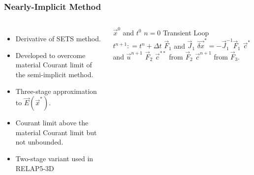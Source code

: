 \documentclass[compress,xcolor=table]{beamer}
\begin{document}
\begin{frame}
\frametitle{Nearly-Implicit Method}

\begin{columns}

\begin{itemize}
\item{Derivative of SETS method.}
\item{Developed to overcome material Courant limit of the semi-implicit method.}
\item{Three-stage approximation to $\vec{E}(\vec{x}^{*})$.}
\item{Courant limit above the material Courant limit but not unbounded.}
\item{Two-stage variant used in RELAP5-3D}
\end{itemize}

\begin{algorithmic}
\scriptsize
\Require $\vec{x}^{0}$ and $t^{0}$
\Set $n = 0$
\Loop \; Transient Loop
    \State $t^{n+1} : = t^{n} + \Delta t$
	\Calculate $\vec{F}_1$ and $\vec{J}_1$
	\Calculate $\vec{\delta x}^{*} = -\vec{J}^{-1}_1\vec{F}_1$
	\Calculate $\vec{c}^{*}$ and $\vec{u}^{n+1}$
	\Calculate $\vec{F}_2$
	\Calculate $\vec{c}^{**}$ from $\vec{F}_2$
	\Calculate $\vec{c}^{n+1}$ from $\vec{F}_3$.
\end{algorithmic}

\end{columns}

\end{frame}
\end{document}
